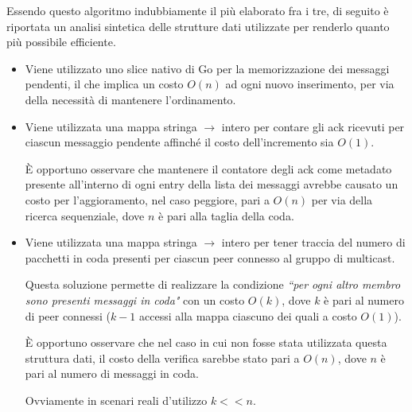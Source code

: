 \documentclass[conference]{IEEEtran}
\begin{document}
Essendo questo algoritmo indubbiamente il più elaborato fra i tre, di seguito è riportata un analisi sintetica delle strutture dati utilizzate per renderlo quanto più possibile efficiente.
\begin{itemize}
\item Viene utilizzato uno slice nativo di Go per la memorizzazione dei messaggi pendenti, il che implica un costo $O(n)$ ad ogni nuovo inserimento, per via della necessità di mantenere l'ordinamento.

\item Viene utilizzata una mappa stringa $\to$ intero per contare gli ack ricevuti per ciascun messaggio pendente affinché il costo dell'incremento sia $O(1)$.

È opportuno osservare che mantenere il contatore degli ack come metadato presente all'interno di ogni entry della lista dei messaggi avrebbe causato un costo per l'aggioramento, nel caso peggiore, pari a $O(n)$ per via della ricerca sequenziale, dove $n$ è pari alla taglia della coda.

\item Viene utilizzata una mappa stringa $\to$ intero per tener traccia del numero di pacchetti in coda presenti per ciascun peer connesso al gruppo di multicast.

Questa soluzione permette di realizzare la condizione \textit{``per ogni altro membro sono presenti messaggi in coda"} con un costo $O(k)$, dove $k$ è pari al numero di peer connessi ($k-1$ accessi alla mappa ciascuno dei quali a costo $O(1)$).

È opportuno osservare che nel caso in cui non fosse stata utilizzata questa struttura dati, il costo della verifica sarebbe stato pari a $O(n)$, dove $n$ è pari al numero di messaggi in coda.

Ovviamente in scenari reali d'utilizzo $k << n$.
\end{itemize}
\end{document}
